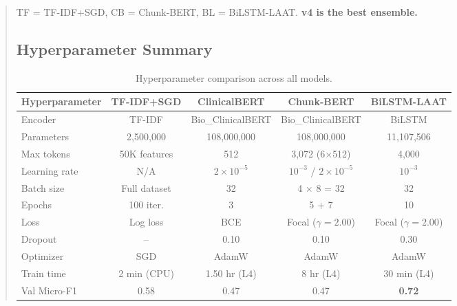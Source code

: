 \documentclass[11pt,a4paper]{article}
\begin{document}
\begin{abstract}
\begin{table}[H]
\vspace{4pt}
\parbox{0.9\textwidth}{\footnotesize TF = TF-IDF+SGD, CB = Chunk-BERT, BL = BiLSTM-LAAT. \textbf{v4 is the best ensemble.}}
\end{table}

\subsection{Hyperparameter Summary}

\begin{table}[H]
\centering
\caption{Hyperparameter comparison across all models.}
\label{tab:hyperparams}
\small
\begin{tabular}{lcccc}
\toprule
\textbf{Hyperparameter} & \textbf{TF-IDF+SGD} & \textbf{ClinicalBERT} & \textbf{Chunk-BERT} & \textbf{BiLSTM-LAAT} \\
\midrule
Encoder          & TF-IDF         & Bio\_ClinicalBERT  & Bio\_ClinicalBERT  & BiLSTM \\
Parameters       & 2,500,000      & 108,000,000        & 108,000,000        & 11,107,506 \\
Max tokens       & 50K features   & 512                & 3,072 (6$\times$512)    & 4,000 \\
Learning rate    & N/A            & $2\!\times\!10^{-5}$ & $10^{-3}$ / $2\!\times\!10^{-5}$ & $10^{-3}$ \\
Batch size       & Full dataset   & 32                 & 4 $\times$ 8 = 32  & 32 \\
Epochs           & 100 iter.      & 3                  & 5 + 7              & 10 \\
Loss             & Log loss       & BCE                & Focal ($\gamma\!=\!2.00$) & Focal ($\gamma\!=\!2.00$) \\
Dropout          & --            & 0.10               & 0.10               & 0.30 \\
Optimizer        & SGD            & AdamW              & AdamW              & AdamW \\
Train time       & 2 min (CPU)    & 1.50 hr (L4)       & 8 hr (L4)          & 30 min (L4) \\
Val Micro-F1     & 0.58           & 0.47               & 0.47               & \textbf{0.72} \\
\bottomrule
\end{tabular}
\end{table}


\end{abstract}
\end{document}
